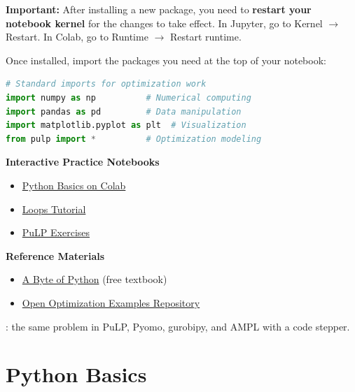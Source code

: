\textbf{Important:} After installing a new package, you need to \textbf{restart your notebook kernel} for the changes to take effect. In Jupyter, go to Kernel $\rightarrow$ Restart. In Colab, go to Runtime $\rightarrow$ Restart runtime.

Once installed, import the packages you need at the top of your notebook:

\begin{lstlisting}[language=Python]
# Standard imports for optimization work
import numpy as np          # Numerical computing
import pandas as pd         # Data manipulation
import matplotlib.pyplot as plt  # Visualization
from pulp import *          # Optimization modeling
\end{lstlisting}

\begin{resource}
\textbf{Interactive Practice Notebooks}
\begin{itemize}
\item \href{https://colab.research.google.com/drive/1dqQSVfNMchIbk0k4OByve0muZeyvih6j?usp=sharing}{Python Basics on Colab}
\item \href{https://colab.research.google.com/drive/1Ma8tQw6LU0NCF3jY62v7FAmXJOxbSph_?usp=sharing}{Loops Tutorial}
\item \href{https://colab.research.google.com/drive/1paYp36cHf_EvZcMYfD-dN1TtJ_abkpM2?usp=sharing}{PuLP Exercises}
\end{itemize}

\textbf{Reference Materials}
\begin{itemize}
\item \href{https://open.umn.edu/opentextbooks/textbooks/a-byte-of-python}{A Byte of Python} (free textbook)
\item \href{https://github.com/open-optimization/open-optimization-or-examples}{Open Optimization Examples Repository}
\end{itemize}
\end{resource}

\begin{tryit}
: the same problem in PuLP, Pyomo, gurobipy, and AMPL with a code stepper.
\end{tryit}


\section{Python Basics}

